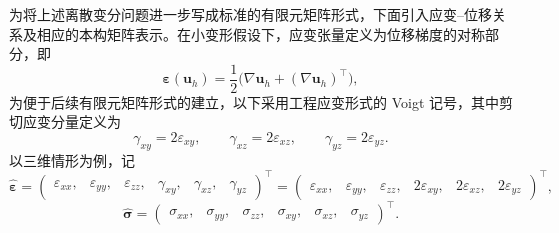%

为将上述离散变分问题进一步写成标准的有限元矩阵形式，下面引入应变--位移关系及相应的本构矩阵表示。在小变形假设下，应变张量定义为位移梯度的对称部分，即
\[
\boldsymbol{\varepsilon}(\boldsymbol{u}_h) = \frac{1}{2}\bigl(\nabla\boldsymbol{u}_h + (\nabla\boldsymbol{u}_h)^{\top}\bigr),
\]
为便于后续有限元矩阵形式的建立，以下采用工程应变形式的 Voigt 记号，其中剪切应变分量定义为
\[
\gamma_{xy}=2\varepsilon_{xy},\qquad \gamma_{xz}=2\varepsilon_{xz},\qquad \gamma_{yz}=2\varepsilon_{yz}.
\]
以三维情形为例，记
\[
\hat{\boldsymbol{\varepsilon}} = 
\begin{pmatrix} 
	\varepsilon_{xx},&\varepsilon_{yy},&\varepsilon_{zz},&\gamma_{xy},&\gamma_{xz},&\gamma_{yz} 
\end{pmatrix}^{\top} 
= 
\begin{pmatrix} 
	\varepsilon_{xx},&\varepsilon_{yy},&\varepsilon_{zz},&2\varepsilon_{xy},&2\varepsilon_{xz},&2\varepsilon_{yz}
\end{pmatrix}^{\top},
\]
\[
\hat{\boldsymbol{\sigma}} = \begin{pmatrix} \sigma_{xx},&\sigma_{yy},&\sigma_{zz},&\sigma_{xy},&\sigma_{xz},&\sigma_{yz} \end{pmatrix}^{\top}.
\]

